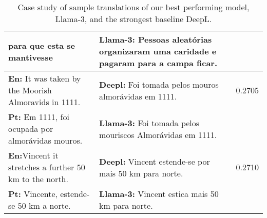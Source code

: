 \begin{table*}[h]
{\begin{tabular}{lll}
    para que esta se mantivesse& \textbf{Llama-3:} Pessoas aleatórias organizaram uma caridade e pagaram para a campa ficar. & \\
      \midrule
     \textbf{En:} It was taken by the Moorish Almoravids in 1111.  & \textbf{Deepl:} Foi tomada pelos mouros almorávidas em 1111. & 0.2705 \\
     \textbf{Pt:}  Em 1111, foi ocupada por almorávidas mouros. & \textbf{Llama-3:} Foi tomada pelos mouriscos Almorávidas em 1111. \\
      \midrule
       \textbf{En:}Vincent it stretches a further 50 km to the north.  & \textbf{Deepl:} Vincent estende-se por mais 50 km para norte. & 0.2710 \\
       \textbf{Pt:}  Vincente, estende-se 50 km a norte. &\textbf{Llama-3:} Vincent estica mais 50 km para norte.  & \\
\bottomrule
\end{tabular}%
}

\caption{Case study of sample translations of our best performing model, Llama-3, and the strongest baseline DeepL.} 
\label{tab:parameters}
\end{table*}